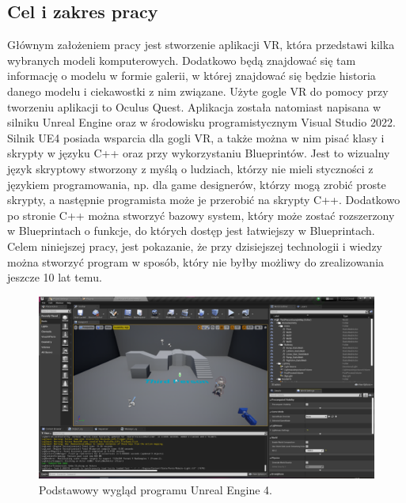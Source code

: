\documentclass[a4paper,12pt,reqno]{article}
\begin{document}
\subsection{Cel i zakres pracy}

Głównym założeniem pracy jest stworzenie aplikacji VR, która przedstawi kilka wybranych modeli komputerowych. Dodatkowo będą znajdować się tam informację o modelu w formie galerii, w której znajdować się będzie historia danego modelu i ciekawostki z nim związane. Użyte gogle VR do pomocy przy tworzeniu aplikacji to Oculus Quest. Aplikacja została natomiast napisana w silniku Unreal Engine oraz w środowisku programistycznym Visual Studio 2022. Silnik UE4 posiada wsparcia dla gogli VR, a także można w nim pisać klasy i skrypty w języku C++ oraz przy wykorzystaniu Blueprintów. Jest to wizualny język skryptowy stworzony z myślą o ludziach, którzy nie mieli styczności z językiem programowania, np. dla game designerów, którzy mogą zrobić proste skrypty, a następnie programista może je przerobić na skrypty C++. Dodatkowo po stronie C++ można stworzyć bazowy system, który może zostać rozszerzony w Blueprintach o funkcje, do których dostęp jest łatwiejszy w Blueprintach. Celem niniejszej pracy, jest pokazanie, że przy dzisiejszej technologii i wiedzy można stworzyć program w sposób, który nie byłby możliwy do zrealizowania jeszcze 10 lat temu.

\begin{figure}[!ht]%
\centering
\includegraphics[width=1\columnwidth]{graphics/UE4View.png}
\caption{Podstawowy wygląd programu Unreal Engine 4.
\label{OpenBrush}}%
%
\qquad
\end{figure}  
\end{document}
